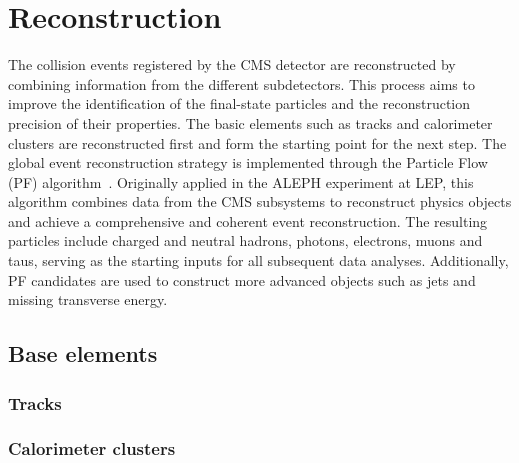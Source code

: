 \chapter{Reconstruction}

The collision events registered by the CMS detector are reconstructed by combining information from the different subdetectors.
This process aims to improve the identification of the final-state particles and the reconstruction precision of their properties.
The basic elements such as tracks and calorimeter clusters are reconstructed first and form the starting point for the next step.
The global event reconstruction strategy is implemented through the Particle Flow (PF) algorithm~\cite{CMS-PRF-14-001}.
Originally applied in the ALEPH experiment at LEP, this algorithm combines data from the CMS subsystems to reconstruct physics objects and achieve a comprehensive and coherent event reconstruction.
The resulting particles include charged and neutral hadrons, photons, electrons, muons and taus, serving as the starting inputs for all subsequent data analyses.
Additionally, PF candidates are used to construct more advanced objects such as jets and missing transverse energy.



\section{Base elements}
\subsection{Tracks}
\label{sec:tracks}


\subsection{Calorimeter clusters}


